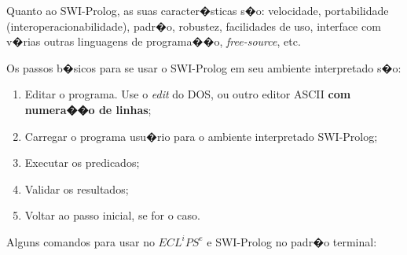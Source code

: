 \documentclass[final,a4paper]{article}
\begin{document}
Quanto ao SWI-Prolog, as suas caracter�sticas s�o:
velocidade, portabilidade (interoperacionabilidade), padr�o, 
robustez, facilidades de uso, interface com v�rias outras 
linguagens de programa��o, \emph{free-source}, etc.

Os passos b�sicos para se usar o SWI-Prolog em seu ambiente
interpretado s�o:

\begin{enumerate}
\item  Editar o programa. Use o \emph{edit} do DOS, ou outro editor ASCII 
{\bf com numera��o de linhas};

\item  Carregar o programa usu�rio para o ambiente interpretado SWI-Prolog;

\item  Executar os predicados;

\item  Validar os resultados;

\item  Voltar ao passo inicial, se for o caso.
\end{enumerate}

\newpage 

Alguns comandos para usar no $ECL^iPS^e$ e 
SWI-Prolog no padr�o terminal:
\end{document}
